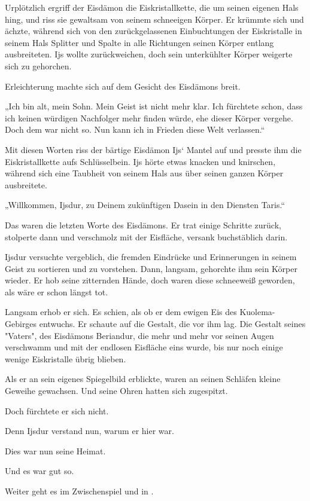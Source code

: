 Urplötzlich ergriff der Eisdämon die Eiskristallkette, die um seinen eigenen Hals hing, und riss sie gewaltsam von seinem schneeigen Körper. Er krümmte sich und ächzte, während sich von den zurückgelassenen Einbuchtungen der Eiskristalle in seinem Hals Splitter und Spalte in alle Richtungen seinen Körper entlang ausbreiteten. Ijs wollte zurückweichen, doch sein unterkühlter Körper weigerte sich zu gehorchen.

Erleichterung machte sich auf dem Gesicht des Eisdämons breit.

„Ich bin alt, mein Sohn. Mein Geist ist nicht mehr klar. Ich fürchtete schon, dass ich keinen würdigen Nachfolger mehr finden würde, ehe dieser Körper vergehe. Doch dem war nicht so. Nun kann ich in Frieden diese Welt verlassen.“

Mit diesen Worten riss der bärtige Eisdämon Ijs‘ Mantel auf und presste ihm die Eiskristallkette aufs Schlüsselbein. Ijs hörte etwas knacken und knirschen, während sich eine Taubheit von seinem Hals aus über seinen ganzen Körper ausbreitete.

„Willkommen, Ijsdur, zu Deinem zukünftigen Dasein in den Diensten Taris.“

Das waren die letzten Worte des Eisdämons. Er trat einige Schritte zurück, stolperte dann und verschmolz mit der Eisfläche, versank buchstäblich darin.

Ijsdur versuchte vergeblich, die fremden Eindrücke und Erinnerungen in seinem Geist zu sortieren und zu vorstehen. Dann, langsam, gehorchte ihm sein Körper wieder. Er hob seine zitternden Hände, doch waren diese schneeweiß geworden, als wäre er schon längst tot.

Langsam erhob er sich. Es schien, als ob er dem ewigen Eis des Kuolema-Gebirges entwuchs. Er schaute auf die Gestalt, die vor ihm lag. Die Gestalt seines "Vaters", des Eisdämons Beriandur, die mehr und mehr vor seinen Augen verschwamm und mit der endlosen Eisfläche eins wurde, bis nur noch einige wenige Eiskristalle übrig blieben.

Als er an sein eigenes Spiegelbild erblickte, waren an seinen Schläfen kleine Geweihe gewachsen. Und seine Ohren hatten sich zugespitzt.

Doch fürchtete er sich nicht.

Denn Ijsdur verstand nun, warum er hier war.

Dies war nun seine Heimat.

Und es war gut so.



\begin{commentbox}
    Weiter geht es im Zwischenspiel  und in .
\end{commentbox}










